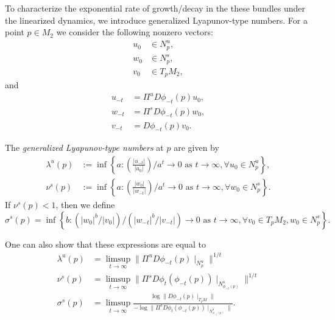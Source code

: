 To characterize the exponential rate of growth/decay in the these bundles under the linearized dynamics, we introduce generalized Lyapunov-type numbers. For a point \(p \in M_2\) we consider the following nonzero vectors:
\begin{equation}
	\begin{aligned}
		u_0 &\in N^u_p, \\
		w_0 &\in N^s_p, \\
		v_0 &\in T_p M_2,
	\end{aligned}
\end{equation}
and 
\begin{equation}
	\begin{aligned}
		u_{-t} &= \Pi^u D\phi_{-t}(p) u_0, \\
		w_{-t} &= \Pi^s D\phi_{-t}(p) w_0, \\
		v_{-t} &= D\phi_{-t}(p) v_0.
	\end{aligned}
\end{equation}
\begin{defn}
	The \emph{generalized Lyapunov-type numbers} at \(p\) are given by
	\begin{align}
		\lambda^u(p) &:= \inf \left\{ a : \left( \frac{|u_{-t}|}{|u_0|}\right) /  a^t \to 0  \text{ as }t\to\infty, \forall u_0 \in N^u_p \right\} ,\\
		\nu^s(p) &:= \inf \left\{ a : \left( \frac{|w_{0}|}{|w_{-t}|}\right) /  a^t \to 0  \text{ as }t\to\infty, \forall w_0 \in N^s_p \right\}.
	\end{align}
	If \(\nu^s(p) < 1\), then we define
	\begin{equation}
		\sigma^s(p) = \inf \left\{ b: (|w_0|^b /|v_0|) / (|w_{-t}|^b/ |v_{-t}| ) \to 0 \text{ as } t\to \infty, \forall v_0 \in T_pM_2, w_0 \in N^s_p  \right\}.
	\end{equation}
\end{defn}
One can also show that these expressions are equal to 
\begin{align}
	\lambda^u(p) &= \limsup_{t\to\infty} \|\Pi^u D\phi_{-t}(p) \mid_{N^u_p} \| ^{1/t} \\
	\nu^s(p) &= \limsup_{t\to\infty} \|\Pi^s D\phi_t(\phi_{-t} (p) ) \mid_{N^s_{\phi_{-t}(p)}} \|^{1/t} \\
	\sigma^s(p) &= \limsup_{t\to\infty} \frac{ \log \| D\phi_{-t}(p) \mid_{T_pM}\|}{-\log\| \Pi^s D\phi_t(\phi_{-t}(p)) \mid_{N^s_{\phi_{-t}(p)} } \|}.
\end{align}

